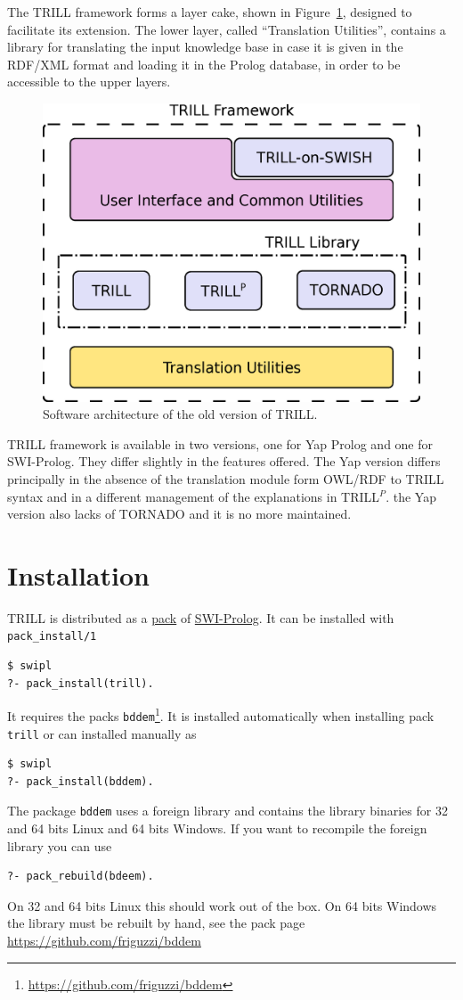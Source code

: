 \documentclass[a4paper,10pt]{scrartcl}
\begin{document}
The TRILL framework forms a layer cake, shown in Figure~\ref{fig:trill_arch}, designed to facilitate its extension. The lower layer, called ``Translation Utilities'', contains a library for translating the input knowledge base in case it is given in the RDF/XML format and loading it in the Prolog database, in order to be accessible to the upper layers.
\begin{figure}
	\centering
	\includegraphics[width=0.5\linewidth]{img/trill-architecture}
	\caption{Software architecture of the old version of TRILL.}
	\label{fig:trill_arch}
\end{figure}

TRILL framework is available in two versions, one for Yap Prolog and one for SWI-Prolog. They differ slightly in the features offered.
The Yap version differs principally in the absence of the translation module form OWL/RDF to TRILL syntax and in a different management of the explanations in TRILL$^P$. the Yap version also lacks of TORNADO and it is no more maintained.

\section{Installation}
TRILL is distributed as a \href{http://www.swi-prolog.org/pack/list?p=trill}{pack} of \href{http://www.swi-prolog.org/}{SWI-Prolog}.
It can be installed with \verb|pack_install/1|
\begin{verbatim}
$ swipl
?- pack_install(trill).
\end{verbatim}

It requires the packs \verb|bddem|\footnote{\url{https://github.com/friguzzi/bddem}}. It is installed automatically when installing pack \verb|trill| or can installed manually as
\begin{verbatim}
$ swipl
?- pack_install(bddem).
\end{verbatim}
The package \verb|bddem| uses a foreign library and contains the library binaries for 32 and 64 bits Linux and 64 bits Windows. If you want to recompile the foreign library you can use
\begin{verbatim}
?- pack_rebuild(bdeem).
\end{verbatim}
On 32 and 64 bits Linux this should work out of the box. On 64 bits Windows the library must be rebuilt by hand, see the pack page \url{https://github.com/friguzzi/bddem}
\end{document}
